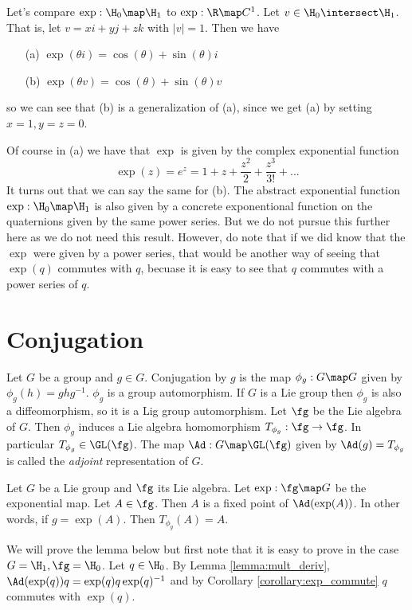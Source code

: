 \documentclass[oneside,12pt]{amsart}
\begin{document}
\begin{remarks} Let's compare $\exp:\H_0 \map \H_1$ to 
$\exp:\R\map C^1$. Let $v\in\H_0\intersect\H_1$. That is,
let $v = x i + y j + z k$ with $|v| = 1$. Then we have
\begin{enumerate}
\item[(a)] $\exp(\theta i) = \cos(\theta) + \sin(\theta)i$
\item[(b)] $\exp(\theta v) = \cos(\theta) + \sin(\theta)v$
\end{enumerate}
so we can see that (b) is a generalization of (a), since we get (a) by setting $x=1,y=z=0$. 

Of course in (a) we have that $\exp$ is given by the complex exponential function
$$\exp(z) = e^z = 1 + z + \frac{z^2}{2} + \frac{z^3}{3!} + ...$$
It turns out that we can say the same for (b). The abstract exponential function $\exp:\H_0 \map \H_1$
is also given by a concrete exponentional function on the quaternions given by the same power series.
But we do not pursue this further here as we do not need this result. However, do note that
if we did know that the $\exp$ were given by a power series, that would be another way of
seeing that $\exp(q)$ commutes with $q$, becuase it is easy to see that $q$ commutes with 
a power series of $q$.
\end{remarks}

\section{Conjugation}

Let $G$ be a group and $g\in G$. Conjugation by $g$ is the map
$\phi_g:G\map G$ given by $\phi_g(h) = g h g^{-1}$. $\phi_g$ is a group automorphism.
If $G$ is a Lie group then $\phi_g$ is also a diffeomorphism, so it is a Lig group automorphism.
Let $\fg$ be the Lie algebra of $G$. Then $\phi_g$ induces a Lie algebra homomorphism 
$T_{\phi_g}:\fg\to\fg$.  In particular $T_{\phi_g}\in\GL(\fg)$.
The map $\Ad:G\map\GL(\fg)$ given by $\Ad(g)= T_{\phi_g}$
is called the \emph{adjoint} representation of $G$.

\begin{lemma}
\label{lemma:adjoint_exponential_fixes_a}
Let $G$ be a Lie group and $\fg$ its Lie algebra. Let $\exp:\fg\map G$ be the exponential map.
Let $A\in \fg$. Then $A$ is a fixed point of $\Ad(\exp(A))$.
In other words, if $g=\exp(A)$. Then $T_{\phi_g}(A) = A$. 
\end{lemma}

We will prove the lemma below but first note that it is easy to prove in the case
$G=\H_1, \fg = \H_0$.  Let $q\in\H_0$.
By Lemma \ref{lemma:mult_deriv}, $\Ad(\exp(q))q = \exp(q) q  \exp(q)^{-1}$ and by
Corollary \ref{corollary:exp_commute} $q$ commutes with $\exp(q)$. 
\end{document}
